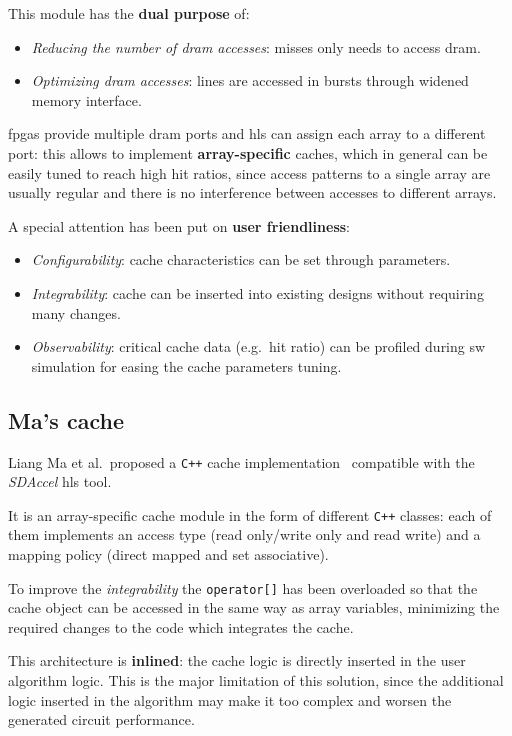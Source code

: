 \documentclass[11pt,a4paper,oneside]{memoir}
\begin{document}
\bigskip
This module has the \textbf{dual purpose} of:
\begin{itemize}
	\item \emph{Reducing the number of \ac{dram} accesses}: misses only
		needs to access \ac{dram}.
	\item \emph{Optimizing \ac{dram} accesses}: lines are accessed in
		bursts through widened memory interface.
\end{itemize}

\acp{fpga} provide multiple \ac{dram} ports and \ac{hls} can assign each array
to a different port: this allows to implement \textbf{array-specific} caches,
which in general can be easily tuned to reach high hit ratios, since access
patterns to a single array are usually regular and there is no interference
between accesses to different arrays.

\bigskip
A special attention has been put on \textbf{user friendliness}:
\begin{itemize}
	\item \emph{Configurability}: cache characteristics can be set through
		parameters.
	\item \emph{Integrability}: cache can be inserted into existing designs
		without requiring many changes.
	\item \emph{Observability}: critical cache data (e.g.\ hit ratio) can
		be profiled during \ac{sw} simulation for easing the cache
		parameters tuning.
\end{itemize}

\subsection{Ma's cache}\label{sec:liang}
Liang Ma et al.\ proposed a \texttt{C++} cache implementation~\cite{liang}
compatible with the \emph{SDAccel\texttrademark} \ac{hls} tool.

It is an array-specific cache module in the form of different \texttt{C++}
classes: each of them implements an access type (read only/write only and read
write) and a mapping policy (direct mapped and set associative).

To improve the \emph{integrability} the \texttt{operator[]} has been overloaded
so that the cache object can be accessed in the same way as array variables,
minimizing the required changes to the code which integrates the cache.

\bigskip
This architecture is \textbf{inlined}: the cache logic is directly inserted in
the user algorithm logic.
This is the major limitation of this solution, since the additional logic
inserted in the algorithm may make it too complex and worsen the generated
circuit performance.
\end{document}

